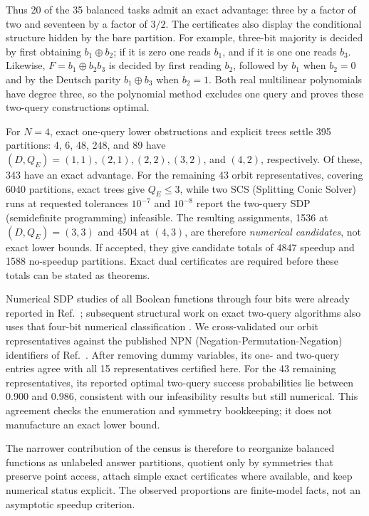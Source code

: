 \documentclass[
  aps,
  prl,
  reprint,
  nofootinbib
]{revtex4-2}
\begin{document}
Thus 20 of the 35 balanced tasks admit an exact advantage: three by a factor
of two and seventeen by a factor of \(3/2\). The certificates also display the
conditional structure hidden by the bare partition. For example, three-bit
majority is decided by first obtaining \(b_1\oplus b_2\); if it is zero one
reads \(b_1\), and if it is one one reads \(b_3\). Likewise,
\(F=b_1\oplus b_2b_3\) is decided by first reading \(b_2\), followed by
\(b_1\) when \(b_2=0\) and by the Deutsch parity \(b_1\oplus b_3\) when
\(b_2=1\). Both real multilinear polynomials have degree three, so the
polynomial method excludes one query and proves these two-query constructions
optimal.

For \(N=4\), exact one-query lower obstructions and explicit trees settle 395
partitions: 4, 6, 48, 248, and 89 have \((D,Q_E)=(1,1),(2,1),(2,2),(3,2)\),
and \((4,2)\), respectively. Of these, 343 have an exact advantage. For the
remaining 43 orbit representatives, covering 6040 partitions, exact trees give
\(Q_E\le3\), while two SCS (Splitting Conic Solver) runs at requested tolerances \(10^{-7}\) and
\(10^{-8}\) report the two-query SDP (semidefinite programming) infeasible. The resulting assignments,
1536 at \((D,Q_E)=(3,3)\) and 4504 at
\((4,3)\), are therefore \emph{numerical candidates}, not exact lower bounds.
If accepted, they give candidate totals of 4847 speedup and 1588 no-speedup
partitions. Exact dual certificates are required before these totals can be
stated as theorems.

Numerical SDP studies of all Boolean functions through four bits were already
reported in Ref.~\cite{MontanaroJozsaMitchison2015}; subsequent structural work
on exact two-query algorithms also uses that four-bit numerical classification
\cite{YeYangHuang2024}. We cross-validated our orbit representatives against
the published NPN (Negation-Permutation-Negation) identifiers of Ref.~\cite{MontanaroJozsaMitchison2015}. After
removing dummy variables, its one- and two-query entries agree with all 15
representatives certified here. For the 43 remaining representatives, its
reported optimal two-query success probabilities lie between 0.900 and 0.986,
consistent with our infeasibility results but still numerical. This agreement
checks the enumeration and symmetry bookkeeping; it does not manufacture an
exact lower bound.

The narrower contribution of the census is therefore to reorganize balanced
functions as unlabeled answer partitions, quotient only by symmetries that
preserve point access, attach simple exact certificates where available, and
keep numerical status explicit. The observed proportions are finite-model
facts, not an asymptotic speedup criterion.
\end{document}
